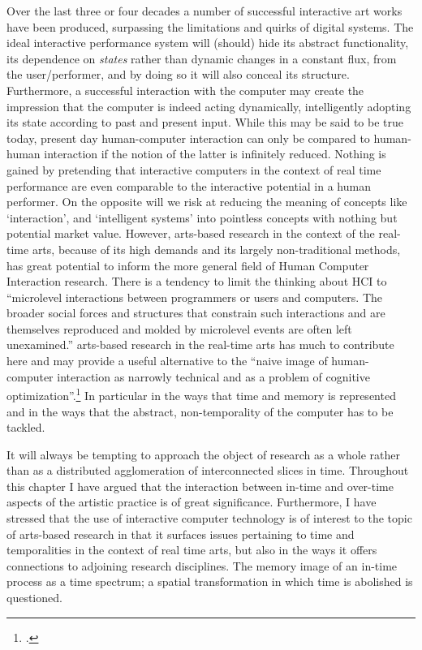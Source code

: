 Over the last three or four decades a number of successful interactive art works have been produced, surpassing the limitations and quirks of digital systems. The ideal interactive performance system will (should) hide its abstract functionality, its dependence on \emph{states} rather than dynamic changes in a constant flux, from the user/performer, and by doing so it will also conceal its structure. Furthermore, a successful interaction with the computer may create the impression that the computer is indeed acting dynamically, intelligently adopting its state according to past and present input. While this may be said to be true today, present day human-computer interaction can only be compared to human-human interaction if the notion of the latter is infinitely reduced. Nothing is gained by pretending that interactive computers in the context of real time performance are even comparable to the interactive potential in a human performer. On the opposite will we risk at reducing the meaning of concepts like `interaction', and `intelligent systems' into pointless concepts with nothing but potential market value. However, arts-based research in the context of the real-time arts, because of its high demands and its largely non-traditional methods, has great potential to inform the  more general field of Human Computer Interaction research. There is a tendency to limit the thinking about HCI to ``microlevel interactions between programmers or users and computers. The broader social forces and structures that constrain such interactions and are themselves reproduced and molded by microlevel events are often left unexamined.'' arts-based research in the real-time arts has much to contribute here and may provide a useful alternative to the  ``naive image of human-computer interaction as narrowly technical and as a problem of cognitive optimization''.\footcite[325]{engestrom96} In particular in the ways that time and memory is represented and in the ways that the abstract, non-temporality of the computer has to be tackled. 





It will always be tempting to approach the object of research as a whole rather than as a distributed agglomeration of interconnected slices in time. Throughout this chapter I have argued that the interaction between in-time and over-time aspects of the artistic practice is of great significance. Furthermore, I have stressed that the use of interactive computer technology is of interest to the topic of arts-based research in that it surfaces issues pertaining to time and temporalities in the context of real time arts, but also in the ways it offers connections to adjoining research disciplines. The memory image of an in-time process as a time spectrum; a spatial transformation in which time is abolished is questioned.

